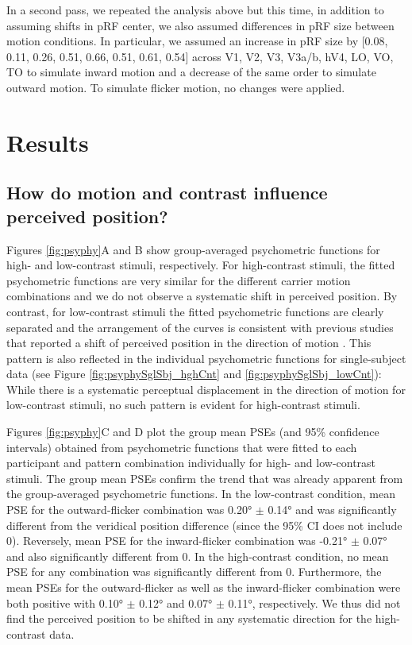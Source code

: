 In a second pass, we repeated the analysis above but this time, in addition to assuming shifts in pRF center, we also assumed differences in pRF size between motion conditions. In particular, we assumed an increase in pRF size by [0.08, 0.11, 0.26, 0.51, 0.66, 0.51, 0.61,  0.54] across V1, V2, V3, V3a/b, hV4, LO, VO, TO to simulate inward motion and a decrease of the same order to simulate outward motion. To simulate flicker motion, no changes were applied.

\section{Results}
\subsection{How do motion and contrast influence perceived position?}
Figures \ref{fig:psyphy}A and B show group-averaged psychometric functions for high- and low-contrast stimuli, respectively. For high-contrast stimuli, the fitted psychometric functions are very similar for the different carrier motion combinations and we do not observe a systematic shift in perceived position. By contrast, for low-contrast stimuli the fitted psychometric functions are clearly separated and the arrangement of the curves is consistent with previous studies that reported a shift of perceived position in the direction of motion \parencite{Ramachandran1990, DeValois1991, Nishida1999, Fu2001, McGraw2002, Chung2007, Arnold2007, Kwon2015}. This pattern is also reflected in the individual psychometric functions for single-subject data (see Figure \ref{fig:psyphySglSbj_hghCnt} and \ref{fig:psyphySglSbj_lowCnt}): While there is a systematic perceptual displacement in the direction of motion for low-contrast stimuli, no such pattern is evident for high-contrast stimuli.

Figures \ref{fig:psyphy}C and D plot the group mean PSEs (and 95\% confidence intervals) obtained from psychometric functions that were fitted to each participant and pattern combination individually for high- and low-contrast stimuli. The group mean PSEs confirm the trend that was already apparent from the group-averaged psychometric functions. In the low-contrast condition, mean PSE for the outward-flicker combination was 0.20° $\pm$ 0.14° and was significantly different from the veridical position difference (since the 95\% CI does not include 0). Reversely, mean PSE for the inward-flicker combination was -0.21° $\pm$ 0.07° and also significantly different from 0. In the high-contrast condition, no mean PSE for any combination was significantly different from 0. Furthermore, the mean PSEs for the outward-flicker as well as the inward-flicker combination were both positive with 0.10° $\pm$ 0.12° and 0.07° $\pm$ 0.11°, respectively. We thus did not find the perceived position to be shifted in any systematic direction for the high-contrast data.


